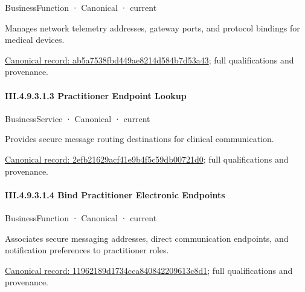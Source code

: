 \label{element:ab5a7538fbd449ae8214d584b7d53a43}
{\small BusinessFunction · Canonical · current}\par

Manages network telemetry addresses, gateway ports, and protocol bindings for medical devices.


{\footnotesize \href{../../../../../../../../continuum/business/business-function/ab5a7538fbd449ae8214d584b7d53a43.md}{Canonical record: ab5a7538fbd449ae8214d584b7d53a43}; full qualifications and provenance.}\par
\paragraph*{III.4.9.3.1.3 Practitioner Endpoint Lookup}
\label{navigation:III.4.9.3.1.3}

\label{element:2efb21629acf41e9b4f5c59db00721d0}
{\small BusinessService · Canonical · current}\par

Provides secure message routing destinations for clinical communication.


{\footnotesize \href{../../../../../../../../continuum/business/business-service/2efb21629acf41e9b4f5c59db00721d0.md}{Canonical record: 2efb21629acf41e9b4f5c59db00721d0}; full qualifications and provenance.}\par
\paragraph*{III.4.9.3.1.4 Bind Practitioner Electronic Endpoints}
\label{navigation:III.4.9.3.1.4}

\label{element:11962189d1734cca840842209613c8d1}
{\small BusinessFunction · Canonical · current}\par

Associates secure messaging addresses, direct communication endpoints, and notification preferences to practitioner roles.


{\footnotesize \href{../../../../../../../../continuum/business/business-function/11962189d1734cca840842209613c8d1.md}{Canonical record: 11962189d1734cca840842209613c8d1}; full qualifications and provenance.}\par
